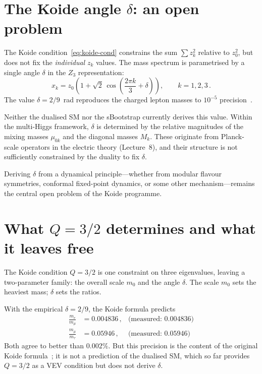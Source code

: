 \documentclass[11pt,a4paper]{article}
\theoremstyle{definition}\newtheorem{exercise}{Exercise}[section]
\begin{document}
\section{The Koide angle $\delta$: an open problem}
\label{sec:angle}

The Koide condition~\eqref{eq:koide-cond} constrains the sum
$\sum z_k^2$ relative to $z_0^2$, but does not fix the
\emph{individual} $z_k$ values.  The mass spectrum is
parametrised by a single angle $\delta$ in the $Z_3$
representation:
\begin{equation}
  x_k = z_0\!\left(1+\sqrt{2}\,
  \cos\!\left(\frac{2\pi k}{3}+\delta\right)\right),
  \qquad k = 1,2,3\,.
  \label{eq:z3}
\end{equation}
The value $\delta = 2/9$~rad reproduces the charged lepton
masses to $10^{-5}$ precision~\cite{Brannen2006}.

Neither the dualised SM nor the sBootstrap currently derives
this value.  Within the multi-Higgs framework, $\delta$ is
determined by the relative magnitudes of the mixing masses
$\mu_{0k}$ and the diagonal masses $M_k$.  These originate
from Planck-scale operators in the electric theory
(Lecture~8), and their structure is not sufficiently
constrained by the duality to fix $\delta$.

Deriving $\delta$ from a dynamical principle---whether from
modular flavour symmetries, conformal fixed-point dynamics,
or some other mechanism---remains the central open problem
of the Koide programme.

\section{What $Q = 3/2$ determines and what it leaves free}
\label{sec:spectrum}

The Koide condition $Q = 3/2$ is one constraint on three
eigenvalues, leaving a two-parameter family: the overall
scale $m_0$ and the angle $\delta$.  The scale $m_0$ sets
the heaviest mass; $\delta$ sets the ratios.

With the empirical $\delta = 2/9$, the Koide formula predicts
\begin{align}
  \frac{m_e}{m_\mu} &= 0.004836\,,
  & \text{(measured: } 0.004836\text{)} \\
  \frac{m_\mu}{m_\tau} &= 0.05946\,,
  & \text{(measured: } 0.05946\text{)}
\end{align}
Both agree to better than $0.002\%$.  But this precision is
the content of the original Koide formula~\cite{Koide1983}; it
is not a prediction of the dualised SM, which so far provides
$Q = 3/2$ as a VEV condition but does not derive $\delta$.
\end{document}
